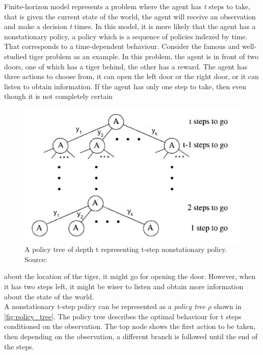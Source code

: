 Finite-horizon model represents a problem where the agent has \textit{t} steps to take, that is given the current state of the world, the agent will receive an observation and make a decision \textit{t} times. In this model, it is more likely that the agent has a nonstationary policy, a policy which is a sequence of policies indexed by time. That corresponds to a time-dependent behaviour. Consider the famous and well-studied tiger problem as an example. In this problem, the agent is in front of two doors, one of which has a tiger behind, the other has a reward. The agent has three actions to choose from, it can open the left door or the right door, or it can listen to obtain information. If the agent has only one step to take, then even though it is not completely certain
\begin{figure}
	\begin{center}
		\includegraphics[width=1\linewidth]{figures/policy_tree}
		\caption[A policy tree representing nonstationary policy of POMDP]{A policy tree of depth t representing t-step nonstationary policy. Source: \cite{KAELBLING199899}}
		\label{fig:policy_tree}
	\end{center}
	\vspace{-40pt}
\end{figure} 
about the location of the tiger, it might go for opening the door. However, when it has two steps left, it might be wiser to listen and obtain more information about the state of the world.\\
A nonstationary t-step policy can be represented as a \textit{policy tree} $ \rho $ shown in \autoref{fig:policy_tree}. The policy tree describes the optimal behaviour for t steps conditioned on the observation. The top node shows the first action to be taken, then depending on the observation, a different branch is followed until the end of the steps. \\\\

